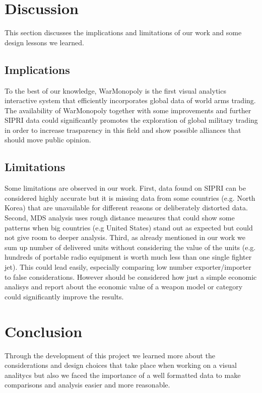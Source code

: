 \documentclass{article}
\begin{document}
\begin{multicols}{2}
\section{Discussion}

This section discusses the implications and limitations of our work and some design lessons we learned.
\subsection{Implications}
To the best of our knowledge, WarMonopoly is the first visual analytics interactive system that efficiently incorporates  global data of world arms trading. The availability of WarMonopoly together with some improvements and further SIPRI data could 
significantly promotes the exploration of global military trading in order to increase trasparency in this field and show possible alliances that should move public opinion. 

\subsection{Limitations}

Some limitations are observed in our work. First, data found on SIPRI can be considered highly accurate but it is missing data from some countries (e.g. North Korea) that are unavailable for different reasons or deliberately distorted data. Second, MDS analysis uses rough distance measures that could show some patterns when big countries (e.g United States) stand out as expected but could not  give room to deeper analysis.
Third, as already mentioned in our work we sum up number of delivered units without considering the value of the units (e.g. hundreds of portable radio equipment is worth much less than one single fighter jet). This could lead easily, especially comparing low number exporter/importer to false considerations. However should be considered how just a simple economic analisys and report about the economic value of a weapon model or category could significantly improve the results.




\section{Conclusion}
Through the development of this project we learned more about the considerations and design choices that take place when working on a visual analitycs but also we faced the importance of a well formatted data to make comparisons and analysis easier and more reasonable.

\end{multicols}
\end{document}
